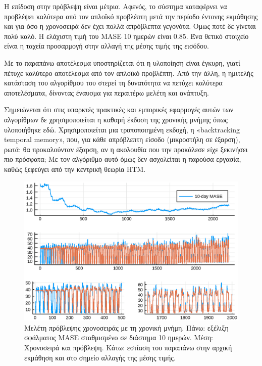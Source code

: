 	Η επίδοση στην πρόβλεψη είναι μέτρια.
	Αφενός, το σύστημα καταφέρνει να προβλέψει καλύτερα από τον απλοϊκό προβλέπτη μετά την περίοδο έντονης εκμάθησης
	και για όσο η χρονοσειρά δεν έχει πολλά απρόβλεπτα γεγονότα.
	Όμως ποτέ δε γίνεται πολύ καλό. Η ελάχιστη τιμή του MASE 10 ημερών είναι 0.85.
	Ένα θετικό στοιχείο είναι η ταχεία προσαρμογή στην αλλαγή της μέσης τιμής της εισόδου.

	Με το παραπάνω αποτέλεσμα υποστηρίζεται ότι η υλοποίηση είναι έγκυρη, γιατί πέτυχε καλύτερο αποτέλεσμα από τον απλοϊκό προβλέπτη.
	Από την άλλη, η ημιτελής κατάσταση του αλγορίθμου του στερεί τη δυνατότητα να πετύχει καλύτερα αποτελέσματα,
	δίνοντας έναυσμα για περαιτέρω μελέτη και ανάπτυξη.

	Σημειώνεται ότι στις υπαρκτές πρακτικές και εμπορικές εφαρμογές αυτών των αλγορίθμων δε χρησιμοποιείται η καθαρή έκδοση της χρονικής μνήμης όπως υλοποιήθηκε εδώ.
	Χρησιμοποιείται μια τροποποιημένη εκδοχή, η «backtracking temporal memory»,
	που, για κάθε απρόβλεπτη είσοδο (μικροστήλη σε έξαρση), ρωτά: θα προκαλούνταν έξαρση, αν η ακολουθία που την προκάλεσε είχε ξεκινήσει πιο πρόσφατα;
	Με τον αλγόριθμο αυτό όμως δεν ασχολείται η παρούσα εργασία, καθώς ξεφεύγει από την κεντρική θεωρία HTM.

	\begin{figure}[t]
		\includegraphics[width=1.05\textwidth,height=.6\textheight]{figures/tm1.eps}
		\caption[μελέτη πρόβλεψης χρονοσειράς με τη χρονική μνήμη]{%
			Μελέτη πρόβλεψης χρονοσειράς με τη χρονική μνήμη.
			Πάνω: εξέλιξη σφάλματος MASE σταθμισμένο σε διάστημα 10 ημερών.
			Μέση: {\color{blue}Χρονοσειρά} και {\color{red} πρόβλεψη}.
			Κάτω: εστίαση του παραπάνω στην αρχική εκμάθηση και στο σημείο αλλαγής της μέσης τιμής.
		}
		\label{fig:tm_tspredict}
	\end{figure}

